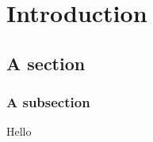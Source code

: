 
\chapter{Introduction}
\label{chap:introduction}
\section{A section}
\subsection{A subsection}
Hello